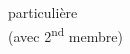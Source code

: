 \documentclass[preview]{standalone}
\begin{document}
\begin{center}
particulière\\(avec 2\textsuperscript{nd} membre)
\end{center}
\end{document}
